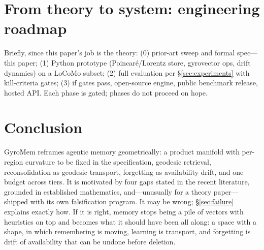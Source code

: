 \documentclass[11pt,a4paper]{article}
\begin{document}
\section{From theory to system: engineering roadmap}

Briefly, since this paper's job is the theory: (0) prior-art sweep and
formal spec---this paper; (1) Python prototype (Poincar\'e/Lorentz store,
gyrovector ops, drift dynamics) on a LoCoMo subset; (2) full evaluation
per \S\ref{sec:experiments} with kill-criteria gates; (3) if gates pass,
open-source engine, public benchmark release, hosted API. Each phase is
gated; phases do not proceed on hope.

\section{Conclusion}

GyroMem reframes agentic memory geometrically: a product manifold with
per-region curvature to be fixed in the specification, geodesic retrieval,
reconsolidation as geodesic transport, forgetting as availability drift,
and one budget across tiers.
It is motivated by four gaps stated in the recent literature, grounded
in established mathematics, and---unusually for a theory paper---shipped
with its own falsification program. It may be wrong; \S\ref{sec:failure}
explains exactly how. If it is right, memory stops being a pile of
vectors with heuristics on top and becomes what it should have been all
along: a space with a shape, in which remembering is moving, learning is
transport, and forgetting is drift of availability that can be undone
before deletion.
\end{document}
